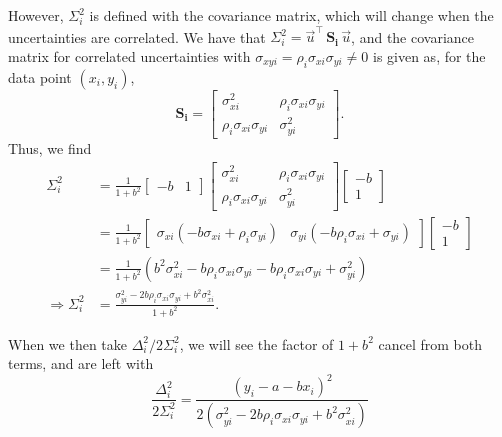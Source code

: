 \documentclass[12pt,a4paper]{article}
\begin{document}
However, $\Sigma_i^2$ is defined with the covariance matrix, which will change when the uncertainties are correlated. We have that $\Sigma_i^2 = \vec{u}^\top\, \mathbf{S_i}\, \vec{u}$, and the covariance matrix for correlated uncertainties with $\sigma_{xyi} = \rho_i \sigma_{xi} \sigma_{yi} \neq 0$ is given as, for the data point $(x_i, y_i)$,
\begin{equation}
 \label{eqn:Si}
 \mathbf{S_i} = \begin{bmatrix}\sigma_{xi}^2 & \rho_i \sigma_{xi} \sigma_{yi} \\ \rho_i \sigma_{xi} \sigma_{yi} & \sigma_{yi}^2\end{bmatrix}.
\end{equation}
Thus, we find
\begin{align}
 \Sigma_i^2 &= \frac{1}{1 + b^2} \begin{bmatrix}-b & 1\end{bmatrix} \begin{bmatrix}\sigma_{xi}^2 & \rho_i \sigma_{xi} \sigma_{yi} \\ \rho_i \sigma_{xi} \sigma_{yi} & \sigma_{yi}^2\end{bmatrix} \begin{bmatrix}-b \\ 1\end{bmatrix} \nonumber \\
 &= \frac{1}{1 + b^2} \begin{bmatrix}\sigma_{xi} \left(-b \sigma_{xi} + \rho_i \sigma_{yi}\right) & \sigma_{yi} \left(-b \rho_i \sigma_{xi} + \sigma_{yi}\right)\end{bmatrix} \begin{bmatrix}-b \\ 1\end{bmatrix} \nonumber \\
 &= \frac{1}{1 + b^2} \left(b^2 \sigma_{xi}^2 - b \rho_i \sigma_{xi} \sigma_{yi} - b \rho_i \sigma_{xi} \sigma_{yi} + \sigma_{yi}^2\right) \nonumber \\
 \Rightarrow \Sigma_i^2 &= \frac{\sigma_{yi}^2 -2 b \rho_i \sigma_{xi} \sigma_{yi} + b^2 \sigma_{xi}^2}{1 + b^2}. \label{eqn:Sigma2}
\end{align}

When we then take $\Delta_i^2/2 \Sigma_i^2$, we will see the factor of $1 + b^2$ cancel from both terms, and are left with
\begin{equation}
 \label{eqn:ans1}
 \boxed{\frac{\Delta_i^2}{2 \Sigma_i^2} = \frac{\left(y_i - a - b x_i\right)^2}{2 \left(\sigma_{yi}^2 - 2 b \rho_i \sigma_{xi} \sigma_{yi} + b^2 \sigma_{xi}^2\right)}}
\end{equation}
\end{document}
